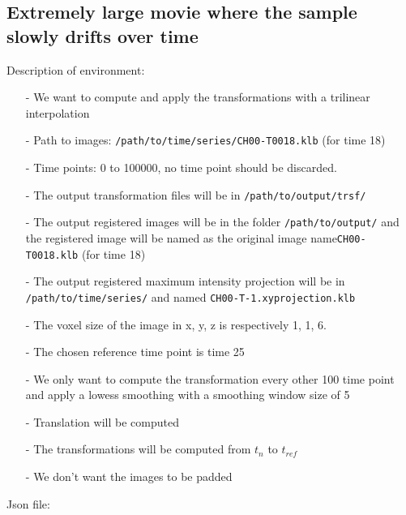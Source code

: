 \documentclass[10pt,a4paper]{book}
\begin{document}
\subsection{Extremely large movie where the sample slowly drifts over time}
Description of environment:
\begin{itemize}
\item[-] We want to compute and apply the transformations with a trilinear interpolation
\item[-] Path to images: \texttt{/path/to/time/series/CH00-T0018.klb} (for time 18)
\item[-] Time points: 0 to 100000, no time point should be discarded.
\item[-] The output transformation files will be in \texttt{/path/to/output/trsf/}
\item[-] The output registered images will be in the folder \texttt{/path/to/output/} and the registered image will be named as the original image name\texttt{CH00-T0018.klb} (for time 18)
\item[-] The output registered maximum intensity projection will be in \texttt{/path/to/time/series/} and named \texttt{CH00-T-1.xyprojection.klb}
\item[-] The voxel size of the image in x, y, z is respectively 1, 1, 6.
\item[-] The chosen reference time point is time 25
\item[-] We only want to compute the transformation every other 100 time point and apply a lowess smoothing with a smoothing window size of 5
\item[-] Translation will be computed
\item[-] The transformations will be computed from $t_n$ to $t_{ref}$
\item[-] We don't want the images to be padded
\end{itemize}
Json file:
\end{document}
